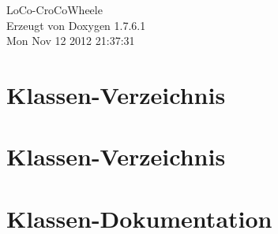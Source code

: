 \documentclass[a4paper]{book}
\begin{document}
\hypersetup{pageanchor=false,citecolor=blue}
\begin{titlepage}
\vspace*{7cm}
\begin{center}
{\Large \-Lo\-Co-\/\-Cro\-Co\-Wheele }\\
\vspace*{1cm}
{\large \-Erzeugt von Doxygen 1.7.6.1}\\
\vspace*{0.5cm}
{\small Mon Nov 12 2012 21:37:31}\\
\end{center}
\end{titlepage}
\clearemptydoublepage
{}
\tableofcontents
\clearemptydoublepage
{}
\hypersetup{pageanchor=true,citecolor=blue}
\chapter{\-Klassen-\/\-Verzeichnis}

\chapter{\-Klassen-\/\-Verzeichnis}

\chapter{\-Klassen-\/\-Dokumentation}















\printindex
\end{document}
